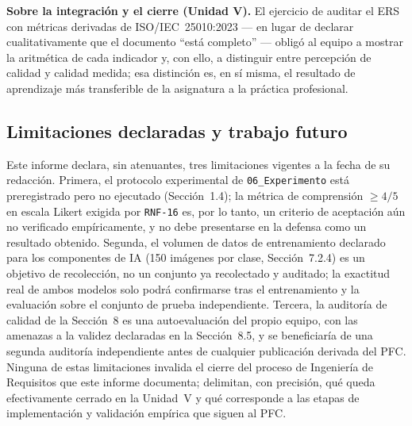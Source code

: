 \documentclass[11pt,a4paper]{article}
\newcommand{\id}[1]{\texttt{#1}}
\begin{document}
\textbf{Sobre la integración y el cierre (Unidad V).} El ejercicio de auditar el ERS con métricas
derivadas de ISO/IEC~25010:2023 --- en lugar de declarar cualitativamente que el documento
``está completo'' --- obligó al equipo a mostrar la aritmética de cada indicador y, con ello, a
distinguir entre percepción de calidad y calidad medida; esa distinción es, en sí misma, el
resultado de aprendizaje más transferible de la asignatura a la práctica profesional.

\subsection{Limitaciones declaradas y trabajo futuro}

Este informe declara, sin atenuantes, tres limitaciones vigentes a la fecha de su redacción.
Primera, el protocolo experimental de \id{06\_Experimento} está preregistrado pero no ejecutado
(Sección~1.4); la métrica de comprensión $\geq 4/5$ en escala Likert exigida por \id{RNF-16} es,
por lo tanto, un criterio de aceptación aún no verificado empíricamente, y no debe presentarse en
la defensa como un resultado obtenido. Segunda, el volumen de datos de entrenamiento declarado para
los componentes de IA (150 imágenes por clase, Sección~7.2.4) es un objetivo de recolección, no un
conjunto ya recolectado y auditado; la exactitud real de ambos modelos solo podrá confirmarse tras
el entrenamiento y la evaluación sobre el conjunto de prueba independiente. Tercera, la auditoría de
calidad de la Sección~8 es una autoevaluación del propio equipo, con las amenazas a la validez
declaradas en la Sección~8.5, y se beneficiaría de una segunda auditoría independiente antes de
cualquier publicación derivada del PFC. Ninguna de estas limitaciones invalida el cierre del proceso
de Ingeniería de Requisitos que este informe documenta; delimitan, con precisión, qué queda
efectivamente cerrado en la Unidad~V y qué corresponde a las etapas de implementación y validación
empírica que siguen al PFC.

\newpage
{}
{}



\newpage
{}
{}
\end{document}
